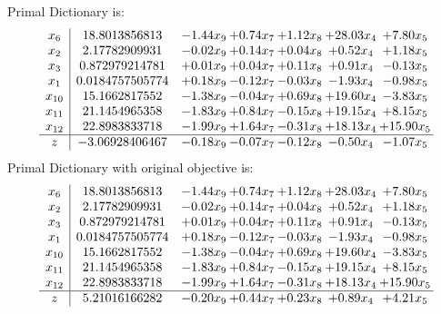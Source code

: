 \documentclass[8pt]{article}
\begin{document}
Primal Dictionary is:
\[\begin{array}{c| c c@{\hskip 2pt} c@{\hskip 2pt} c@{\hskip 2pt} c@{\hskip 2pt} c@{\hskip 2pt} }
 x_{6}   &  18.8013856813 & -1.44 x_{9} & +  0.74 x_{7} & +  1.12 x_{8} & + 28.03 x_{4} & +  7.80 x_{5}\\
 x_{2}   &  2.17782909931 & -0.02 x_{9} & +  0.14 x_{7} & +  0.04 x_{8} & +  0.52 x_{4} & +  1.18 x_{5}\\
 x_{3}   &  0.872979214781 & +  0.01 x_{9} & +  0.04 x_{7} & +  0.11 x_{8} & +  0.91 x_{4} & -0.13 x_{5}\\
 x_{1}   &  0.0184757505774 & +  0.18 x_{9} & -0.12 x_{7} & -0.03 x_{8} & -1.93 x_{4} & -0.98 x_{5}\\
 x_{10}   &  15.1662817552 & -1.38 x_{9} & -0.04 x_{7} & +  0.69 x_{8} & + 19.60 x_{4} & -3.83 x_{5}\\
 x_{11}   &  21.1454965358 & -1.83 x_{9} & +  0.84 x_{7} & -0.15 x_{8} & + 19.15 x_{4} & +  8.15 x_{5}\\
 x_{12}   &  22.8983833718 & -1.99 x_{9} & +  1.64 x_{7} & -0.31 x_{8} & + 18.13 x_{4} & + 15.90 x_{5}\\
\hline
z    &  -3.06928406467 & -0.18 x_{9} & -0.07 x_{7} & -0.12 x_{8} & -0.50 x_{4} & -1.07 x_{5}\\
\end{array}\]
Primal Dictionary with original objective is:
\[\begin{array}{c| c c@{\hskip 2pt} c@{\hskip 2pt} c@{\hskip 2pt} c@{\hskip 2pt} c@{\hskip 2pt} }
 x_{6}   &  18.8013856813 & -1.44 x_{9} & +  0.74 x_{7} & +  1.12 x_{8} & + 28.03 x_{4} & +  7.80 x_{5}\\
 x_{2}   &  2.17782909931 & -0.02 x_{9} & +  0.14 x_{7} & +  0.04 x_{8} & +  0.52 x_{4} & +  1.18 x_{5}\\
 x_{3}   &  0.872979214781 & +  0.01 x_{9} & +  0.04 x_{7} & +  0.11 x_{8} & +  0.91 x_{4} & -0.13 x_{5}\\
 x_{1}   &  0.0184757505774 & +  0.18 x_{9} & -0.12 x_{7} & -0.03 x_{8} & -1.93 x_{4} & -0.98 x_{5}\\
 x_{10}   &  15.1662817552 & -1.38 x_{9} & -0.04 x_{7} & +  0.69 x_{8} & + 19.60 x_{4} & -3.83 x_{5}\\
 x_{11}   &  21.1454965358 & -1.83 x_{9} & +  0.84 x_{7} & -0.15 x_{8} & + 19.15 x_{4} & +  8.15 x_{5}\\
 x_{12}   &  22.8983833718 & -1.99 x_{9} & +  1.64 x_{7} & -0.31 x_{8} & + 18.13 x_{4} & + 15.90 x_{5}\\
\hline
z    &  5.21016166282 & -0.20 x_{9} & +  0.44 x_{7} & +  0.23 x_{8} & +  0.89 x_{4} & +  4.21 x_{5}\\
\end{array}\]
\end{document}
